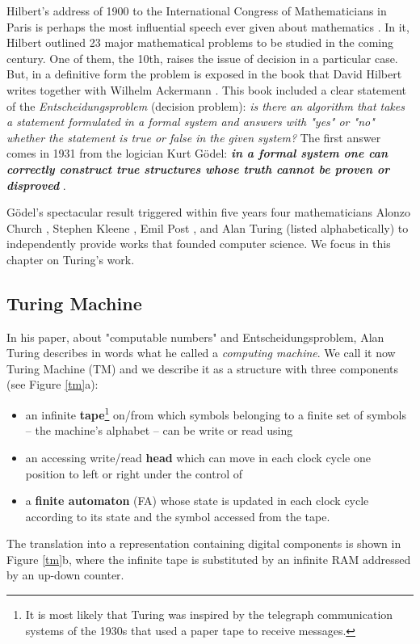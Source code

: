 Hilbert's address of 1900 to the International Congress of Mathematicians in Paris is perhaps the most influential speech ever given about mathematics \cite{Hilbert1900}. In it, Hilbert outlined 23 major mathematical problems to be studied in the coming century. One of them, the 10th, raises the issue of decision in a particular case. But, in a definitive form the problem is exposed in the book that David Hilbert writes together with Wilhelm Ackermann \cite{Hilbert1928}. This book included a clear statement of the {\em Entscheidungsproblem} (decision problem): {\em is there an algorithm that takes a statement formulated in a formal system and answers with "yes" or "no" whether the statement is true or false in the given system?} The first answer comes in 1931 from the logician  Kurt Gödel: {\bf {\em in a formal system one can correctly construct true structures whose truth cannot be proven or disproved}} \cite{Goedel1931} \cite{Goedel31}. 

Gödel's spectacular result triggered within five years four mathematicians Alonzo Church \cite{Church36}, Stephen Kleene \cite{Kleene36}, Emil Post \cite{Post36}, and Alan Turing \cite{Turing36, Turing1937} (listed alphabetically) to independently provide works that founded computer science. We focus in this chapter on Turing's work.

\subsection{Turing Machine}

In his paper, about "computable numbers" and Entscheidungsproblem, Alan Turing describes in words what he called a {\em computing machine}. We call it now Turing Machine (TM) and we describe it as a structure with three components (see Figure \ref{tm}a):
\begin{itemize}
    \item an infinite {\bf tape}\footnote{It is most likely that Turing was inspired by the telegraph communication systems of the 1930s that used a paper tape to receive messages.}  on/from which symbols belonging to a finite set of symbols -- the machine's alphabet -- can be write or read using
    \item an accessing write/read {\bf head} which can move in each clock cycle one position to left or right under the control of
    \item a {\bf finite automaton} (FA) whose state is updated in each clock cycle according to its state and the symbol accessed from the tape.
\end{itemize}
The translation into a representation containing digital components is shown in Figure \ref{tm}b, where the infinite tape is substituted by an infinite RAM addressed by an up-down counter. 

